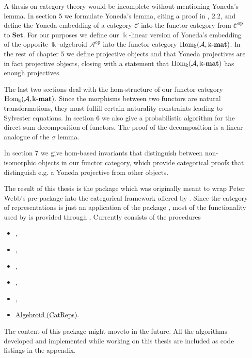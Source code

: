 A thesis on category theory would be incomplete without mentioning Yoneda's lemma. In section 5 we
formulate Yoneda's lemma, citing a proof in \cite{[context]}, 2.2, and define the Yoneda embedding of a category $\mathcal{C}$ into the
functor category from $\mathcal{C}^{\text{op}}$ to $\mathbf{Set}$. For our purposes we
define our $\Bbbk$-linear version of Yoneda's embedding of the opposite $\Bbbk$-algebroid $\mathcal{A}^{\text{op}}$
into the functor category $\mathrm{Hom_{\Bbbk}}(\mathcal{A},\Bbbk\textnormal{-}\mathbf{mat})$. In the rest of chapter 5 we define projective objects and that
Yoneda projectives are in fact projective objects, closing with a statement that $\mathrm{Hom_{\Bbbk}}(\mathcal{A},\Bbbk\textnormal{-}\mathbf{mat})$ has enough projectives.

The last two sections deal with the hom-structure of our functor category $\mathrm{Hom_{\Bbbk}}(\mathcal{A},\Bbbk\textnormal{-}\mathbf{mat})$. Since the morphisms between two
functors are natural transformations, they must fulfill certain naturality constraints leading to Sylvester equations. 
In section 6 we also give a probabilistic algorithm for the direct sum decomposition of functors. The proof of the decomposition is a linear
analogue of the $\sigma$ lemma.

In section 7 we give hom-based invariants that distinguish between non-isomorphic objects in our functor category, which provide 
categorical proofs that distinguish e.g. a Yoneda projective from other objects.

The result of this thesis is the \Gap{} package \CatReps{} which was originally meant to wrap Peter Webb's
pre-package \catreps{} into the categorical framework offered by \CAP. Since the category of representations is just an application of the package
\FunctorCategories, most of the functionality used by \CatReps is provided through \FunctorCategories.
Currently \CatReps consists of the procedures
\begin{itemize}
\item {},
\item {},
\item {},
\item {},
\item {},
\item \hyperref[func:Algebroid_CatReps]{Algebroid (CatReps)}.
\end{itemize}
The content of this package might moveto \FunctorCategories{} in the future. All the algorithms developed and implemented while working on this
thesis are included as code listings in the appendix.
